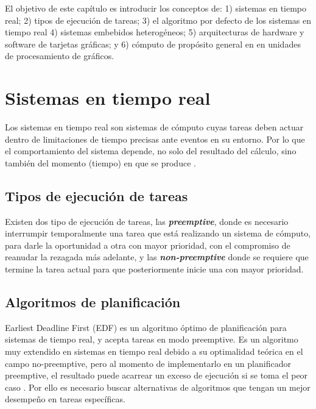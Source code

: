 
El objetivo de este capítulo es introducir los conceptos de: 1) sistemas en tiempo real; 2) tipos de ejecución de tareas; 3) el algoritmo por defecto de los sistemas en tiempo real 4) sistemas embebidos heterogéneos; 5) arquitecturas de hardware y software de tarjetas gráficas; y 6) cómputo de propósito general en en unidades de procesamiento de gráficos.
\section{Sistemas en tiempo real}\label{sec:sistr}

Los sistemas en tiempo real son sistemas de cómputo cuyas tareas deben actuar dentro de limitaciones de tiempo precisas ante eventos en su entorno. Por lo que el comportamiento del sistema depende, no solo del resultado del cálculo, sino también del momento (tiempo) en que se produce \cite{Buta2011}.

\subsection{Tipos de ejecución de tareas}

Existen dos tipo de ejecución de tareas, las \textit{\textbf{preemptive}}, donde es necesario interrumpir temporalmente una tarea que está realizando un sistema de cómputo, para darle la oportunidad a otra con mayor prioridad, con el compromiso de reanudar la rezagada más adelante, y las \textit{\textbf{non-preemptive}} donde se requiere que termine la tarea actual para que posteriormente inicie una con mayor prioridad.

\subsection{Algoritmos de planificación}

Earliest Deadline First (EDF) es un algoritmo óptimo de planificación para sistemas de tiempo real, y acepta tareas en modo preemptive. Es un algoritmo muy extendido en sistemas en tiempo real debido a su optimalidad teórica en el campo no-preemptive, pero al momento de implementarlo en un planificador preemptive, el resultado puede acarrear un exceso de ejecución si se toma el peor caso \cite{EmbSysDes}. Por ello es necesario buscar alternativas de algoritmos que tengan un mejor desempeño en tareas específicas.

